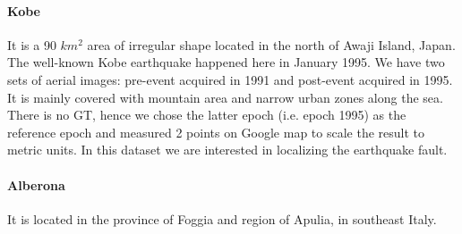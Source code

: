 \paragraph{Kobe} It is a 90 $km^2$ area of irregular shape located in the north of Awaji Island, Japan. The well-known Kobe earthquake happened here in January 1995. We have two sets of aerial images: pre-event acquired in 1991 and post-event acquired in 1995. It is mainly covered with mountain area and narrow urban zones along the sea. There is no \ac{GT}, hence we chose the latter epoch (i.e. epoch 1995) as the reference epoch and measured 2 points on Google map to scale the result to metric units. In this dataset we are interested in localizing the earthquake fault.

\paragraph{Alberona} It is located in the province of Foggia and region of Apulia, in southeast Italy.

